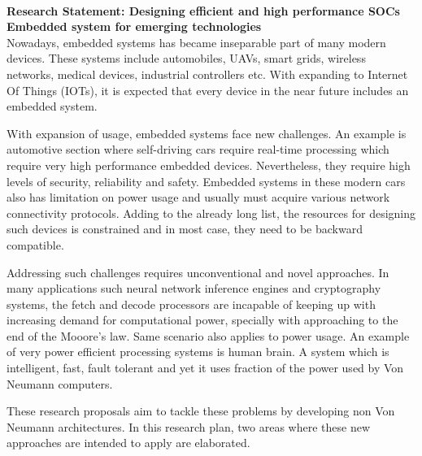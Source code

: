 \newpage
 \thispagestyle{empty}
 \small
{}
 \phantom \quad \\
{\bf Research Statement: 
Designing efficient and high performance SOCs  Embedded system for emerging technologies
}
\vspace*{2\baselineskip}\\
Nowadays, embedded systems has became inseparable part of many modern devices. These systems include automobiles, UAVs, smart grids, wireless networks, medical devices, industrial controllers etc. With expanding to Internet Of Things (IOTs), it is expected that every device in the near future includes an embedded system. 

With expansion of usage, embedded systems face new challenges. An example is automotive section where self-driving cars require real-time processing which require very high performance embedded devices. Nevertheless, they require high levels of security, reliability and safety. Embedded systems in these modern cars also has limitation on power usage and usually must acquire various network connectivity protocols. Adding to the already long list, the resources for designing such devices is constrained and in most case, they need to be backward compatible. 


Addressing such challenges requires unconventional and novel approaches. In many applications such neural network inference engines and cryptography systems, the fetch and decode processors are incapable of keeping up with increasing demand for computational power, specially with approaching to the end of the Mooore's law. Same scenario also applies to power usage. An example of very power efficient  processing systems is human brain. A system which is intelligent, fast, fault tolerant and yet it uses fraction of the power used by Von Neumann computers. 

These research proposals aim to tackle these problems by developing non Von Neumann architectures. In this research plan, two areas where these new approaches are intended to apply are elaborated. \\
